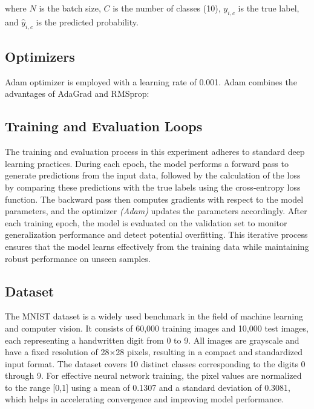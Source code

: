 \documentclass[a4paper, journal]{IEEEtran}
\begin{document}
where $N$ is the batch size, $C$ is the number of classes (10), $y_{i,c}$ is the true label, and $\hat{y}_{i,c}$ is the predicted probability.

\subsection{Optimizers}

Adam optimizer is employed with a learning rate of 0.001. Adam combines the advantages of AdaGrad and RMSprop:

\subsection{Training and Evaluation Loops}

The training and evaluation process in this experiment adheres to standard deep learning practices. During each epoch, the model performs a forward pass to generate predictions from the input data, followed by the calculation of the loss by comparing these predictions with the true labels using the cross-entropy loss function. The backward pass then computes gradients with respect to the model parameters, and the optimizer \emph{(Adam)} updates the parameters accordingly. After each training epoch, the model is evaluated on the validation set to monitor generalization performance and detect potential overfitting. This iterative process ensures that the model learns effectively from the training data while maintaining robust performance on unseen samples.

\subsection{Dataset}

The MNIST dataset is a widely used benchmark in the field of machine learning and computer vision. It consists of 60,000 training images and 10,000 test images, each representing a handwritten digit from 0 to 9. All images are grayscale and have a fixed resolution of 28×28 pixels, resulting in a compact and standardized input format. The dataset covers 10 distinct classes corresponding to the digits 0 through 9. For effective neural network training, the pixel values are normalized to the range [0,1] using a mean of 0.1307 and a standard deviation of 0.3081, which helps in accelerating convergence and improving model performance.
\end{document}
